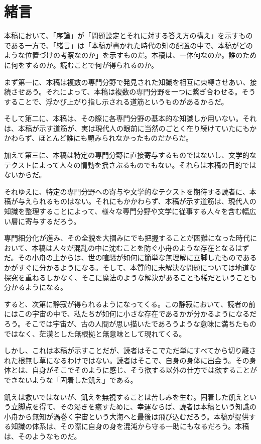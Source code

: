 \section{緒言}\label{ux7dd2ux8a00}

本稿において、「序論」が「問題設定とそれに対する答え方の構え」を示すものである一方で、「緒言」は「本稿が書かれた時代の知の配置の中で、本稿がどのような位置づけの考察なのか」を示すものだ。本稿は、一体何なのか。誰のために何をするのか。読むことで何が得られるのか。

まず第一に、本稿は複数の専門分野で発見された知識を相互に束縛させあい、接続させあう。それによって、本稿は複数の専門分野を一つに繋ぎ合わせる。そうすることで、浮かび上がり指し示される道筋というものがあるからだ。

そして第二に、本稿は、その際に各専門分野の基本的な知識しか用いない。それは、本稿が示す道筋が、実は現代人の眼前に当然のごとく在り続けていたにもかかわらず、ほとんど誰にも顧みられなかったものだからだ。

加えて第三に、本稿は特定の専門分野に直接寄与するものではないし、文学的なテクストによって人々の情動を揺さぶるものでもない。それらは本稿の目的ではないからだ。

それゆえに、特定の専門分野への寄与や文学的なテクストを期待する読者に、本稿が与えられるものはない。それにもかかわらず、本稿が示す道筋は、現代人の知識を整理することによって、様々な専門分野や文学に従事する人々を含む幅広い層に寄与するだろう。

専門細分化が進み、その全貌を大掴みにでも把握することが困難になった時代において、本稿は人々が混乱の中に沈むことを防ぐ小舟のような存在となるはずだ。その小舟の上からは、世の喧騒が如何に簡単な無理解に立脚したものであるかがすぐに分かるようになる。そして、本質的に未解決な問題については地道な探究を重ねるしかなく、そこに魔法のような解決があることも稀だということも分かるようになる。

すると、次第に静寂が得られるようになってくる。この静寂において、読者の前にはこの宇宙の中で、私たちが如何に小さな存在であるかが分かるようになるだろう。そこでは宇宙が、古の人間が思い描いたであろうような意味に満ちたものではなく、茫漠とした無根拠と無意味として現れてくる。

しかし、これは本稿が示すことだが、読者はそこでただ単にすべてから切り離された根無し草になるわけではない。読者はそこで、自身の身体に出会う。その身体とは、自身がそこでそのように感じ、そう欲する以外の仕方では欲することができないような「固着した飢え」である。

飢えは救いではないが、飢えを無視することは苦しみを生む。固着した飢えという立脚点を得て、その渇きを癒すために、幸運ならば、読者は本稿という知識の小舟から無知が渦巻く宇宙という大海へと最後は飛び込むだろう。本稿が提供する知識の体系は、その際に自身の身を混沌から守る一助にもなるだろう。本稿は、そのようなものだ。
